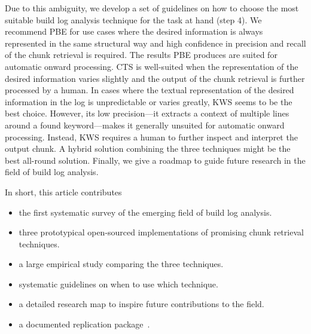 Due to this ambiguity, we develop a set of guidelines
on how to choose the most suitable build log analysis
technique for the task at hand (step 4).
We recommend PBE for use cases where the desired information is always
represented in the same structural way and high confidence in
precision and recall of the chunk retrieval is required.
The results PBE produces are suited for automatic onward processing.
CTS is
well-suited when the representation of the desired information varies
slightly and the output of the chunk retrieval is further processed by
a human.
In cases where the textual representation of the desired
information in the log is unpredictable or varies greatly, KWS seems
to be the best choice.
However, its low precision---it extracts a
context of multiple lines around a found keyword---makes it generally
unsuited for automatic onward processing.
Instead, KWS requires a human
to further inspect and interpret the output chunk.
A hybrid solution combining the three techniques might be the best
all-round solution.
Finally, we give a roadmap to guide future research in the field
of build log analysis.

In short, this article contributes
\begin{itemize}
\item the first systematic survey of the emerging field of build log
analysis.
\item three prototypical open-sourced implementations of
promising chunk retrieval techniques.
\item a large empirical study comparing the three techniques.
\item systematic guidelines on when to use which technique.
\item a detailed research map to inspire future contributions to the
field.
\item a documented replication package~\cite{brandt2020chunk-replication}.
\end{itemize}

